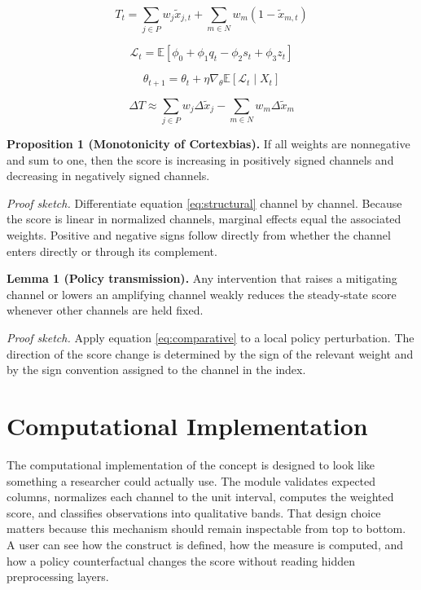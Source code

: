 \documentclass[12pt]{article}
\begin{document}
\begin{equation}
T_t = \sum_{j \in P} w_j \tilde{x}_{j,t} + \sum_{m \in N} w_m (1 - \tilde{x}_{m,t})
\label{eq:structural}
\end{equation}

\begin{equation}
\mathcal{L}_t = \mathbb{E}\left[\phi_0 + \phi_1 q_t - \phi_2 s_t + \phi_3 z_t\right]
\label{eq:loss}
\end{equation}

\begin{equation}
\theta_{t+1} = \theta_t + \eta \nabla_\theta \mathbb{E}[\mathcal{L}_t \mid X_t]
\label{eq:update}
\end{equation}

\begin{equation}
\Delta T \approx \sum_{j \in P} w_j \Delta \tilde{x}_j - \sum_{m \in N} w_m \Delta \tilde{x}_m
\label{eq:comparative}
\end{equation}

\textbf{Proposition 1 (Monotonicity of Cortexbias).} If all weights are nonnegative and sum to one, then the score is increasing in positively signed channels and decreasing in negatively signed channels.

\textit{Proof sketch.} Differentiate equation \eqref{eq:structural} channel by channel. Because the score is linear in normalized channels, marginal effects equal the associated weights. Positive and negative signs follow directly from whether the channel enters directly or through its complement.

\textbf{Lemma 1 (Policy transmission).} Any intervention that raises a mitigating channel or lowers an amplifying channel weakly reduces the steady-state score whenever other channels are held fixed.

\textit{Proof sketch.} Apply equation \eqref{eq:comparative} to a local policy perturbation. The direction of the score change is determined by the sign of the relevant weight and by the sign convention assigned to the channel in the index.

\section{Computational Implementation}
The computational implementation of the concept is designed to look like something a researcher could actually use. The module validates expected columns, normalizes each channel to the unit interval, computes the weighted score, and classifies observations into qualitative bands. That design choice matters because this mechanism should remain inspectable from top to bottom. A user can see how the construct is defined, how the measure is computed, and how a policy counterfactual changes the score without reading hidden preprocessing layers.
\end{document}
